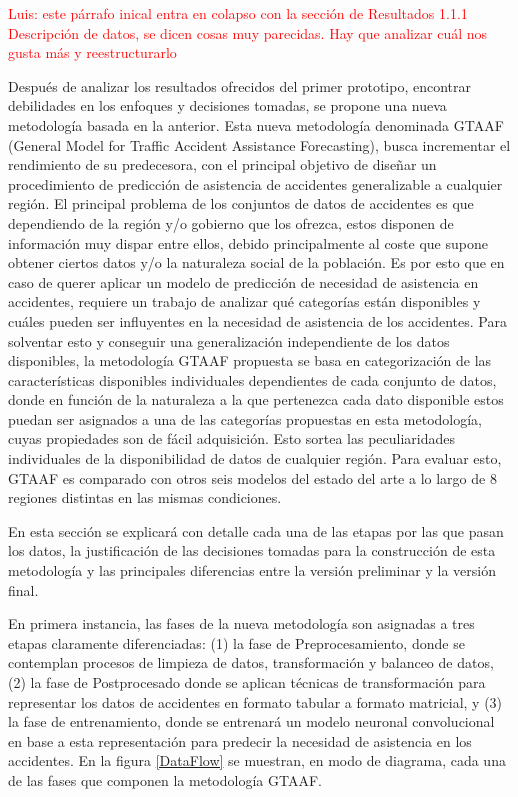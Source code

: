 \documentclass{uathesis-es}
\begin{document}
{	\textcolor{red}{Luis: este párrafo inical entra en colapso con la sección de Resultados 1.1.1 Descripción de datos, se dicen cosas muy parecidas. Hay que analizar cuál nos gusta más y reestructurarlo}
	
	Después de analizar los resultados ofrecidos del primer prototipo, encontrar debilidades en los enfoques y decisiones tomadas, se propone una nueva metodología basada en la anterior. Esta nueva metodología denominada GTAAF (General Model for Traffic Accident Assistance Forecasting), busca incrementar el rendimiento de su predecesora, con el principal objetivo de diseñar un procedimiento de predicción de asistencia de accidentes generalizable a cualquier región. El principal problema de los conjuntos de datos de accidentes es que dependiendo de la región y/o gobierno que los ofrezca, estos disponen de información muy dispar entre ellos, debido principalmente al coste que supone obtener ciertos datos y/o la naturaleza social de la población. Es por esto que en caso de querer aplicar un modelo de predicción de necesidad de asistencia en accidentes, requiere un trabajo de analizar qué categorías están disponibles y cuáles pueden ser influyentes en la necesidad de asistencia de los accidentes. Para solventar esto y conseguir una generalización independiente de los datos disponibles, la metodología GTAAF propuesta se basa en categorización de las características disponibles individuales dependientes de cada conjunto de datos, donde en función de la naturaleza a la que pertenezca cada dato disponible estos puedan ser asignados a una de las categorías propuestas en esta metodología, cuyas propiedades son de fácil adquisición. Esto sortea las peculiaridades individuales de la disponibilidad de datos de cualquier región. Para evaluar esto, GTAAF es comparado con otros seis modelos del estado del arte a lo largo de 8 regiones distintas en las mismas condiciones.
	
	En esta sección se explicará con detalle cada una de las etapas por las que pasan los datos, la justificación de las decisiones tomadas para la construcción de esta metodología y las principales diferencias entre la versión preliminar y la versión final.
	
	En primera instancia, las fases de la nueva metodología son asignadas a tres etapas claramente diferenciadas: (1) la fase de Preprocesamiento, donde se contemplan procesos de limpieza de datos, transformación y balanceo de datos, (2) la fase de Postprocesado donde se aplican técnicas de transformación para representar los datos de accidentes en formato tabular a formato matricial, y (3) la fase de entrenamiento, donde se entrenará un modelo neuronal convolucional en base a esta representación para predecir la necesidad de asistencia en los accidentes. En la figura \ref{DataFlow} se muestran, en modo de diagrama, cada una de las fases que componen la metodología GTAAF.
	
}
\end{document}
